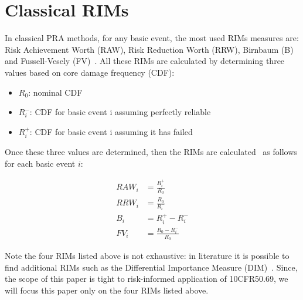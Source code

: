 \section{Classical RIMs}
\label{sec:classicalRIMs}

In classical PRA methods, for any basic event, the most used RIMs measures are: 
Risk Achievement Worth (RAW), Risk Reduction Worth (RRW), Birnbaum (B) and 
Fussell-Vesely (FV)~\cite{}. 
All these RIMs are calculated by determining three values based on core damage 
frequency (CDF):
\begin{itemize}
  \item $R_0$: nominal CDF
  \item $R_i^-$: CDF for basic event i assuming perfectly reliable
  \item $R_i^+$: CDF for basic event i assuming it has failed
\end{itemize}

Once these three values are determined, then the RIMs are calculated~\cite{} as 
follows for each basic event $i$:

\begin{align} 
  RAW_i &= \frac{R_i^+}{R_0}  \\
  RRW_i &= \frac{R_0}{R_i^-}  \\
  B_i &= R_i^+-R_i^-   \\
  FV_i &= \frac{R_0-R_i^-}{R_0} 
\end{align}

Note the four RIMs listed above is not exhaustive: in literature it is possible to 
find additional RIMs such as the 
Differential Importance Measure (DIM)~\cite{}. 
Since, the scope of this paper is tight to risk-informed application of 10CFR50.69, 
we will focus this paper only on the four RIMs listed above.

